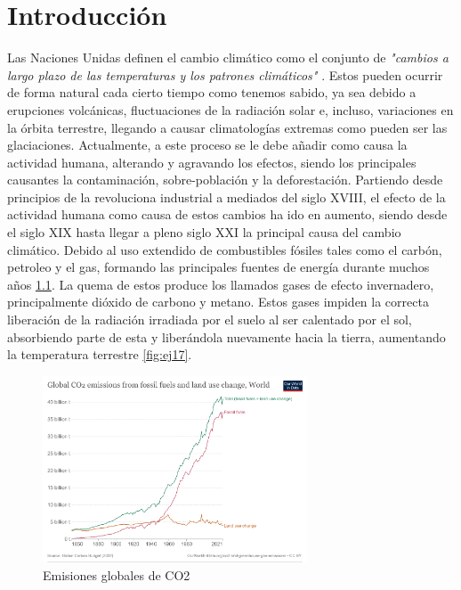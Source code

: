 \chapter[Introducción]{Introducción}
\label{Chap1}

Las Naciones Unidas definen el cambio climático como el conjunto de \textit{"cambios a largo plazo de las temperaturas y los patrones climáticos"} \cite{UNWeb}. Estos pueden ocurrir de forma natural cada cierto tiempo como tenemos sabido, ya sea debido a erupciones volcánicas, fluctuaciones de la radiación solar e, incluso, variaciones en la órbita terrestre, llegando a causar climatologías extremas como pueden ser las glaciaciones. Actualmente, a este proceso se le debe añadir como causa la actividad humana, alterando y agravando los efectos, siendo los principales causantes la contaminación, sobre-población y la deforestación.\newline
\newline
Partiendo desde principios de la revoluciona industrial a mediados del siglo XVIII, el efecto de la actividad humana como causa de estos cambios ha ido en aumento, siendo desde el siglo XIX hasta llegar a pleno siglo XXI la principal causa del cambio climático. Debido al uso extendido de combustibles fósiles tales como el carbón, petroleo y el gas, formando las principales fuentes de energía durante muchos años \ref{fig:ej16}.\newline
\newline
La quema de estos produce los llamados gases de efecto invernadero, principalmente dióxido de carbono y metano. Estos gases impiden la correcta liberación de la radiación irradiada por el suelo al ser calentado por el sol, absorbiendo parte de esta y liberándola nuevamente hacia la tierra, aumentando la temperatura terrestre \ref{fig:ej17}.

\begin{figure} [H]
	\centering
	\includegraphics[width=0.7\textwidth]{fig/global-co2-fossil-plus-land-use.png}
	\caption[Emisiones globales de CO2]{Emisiones globales de CO2 \footnotemark}
	\label{fig:ej16}
\end{figure}

